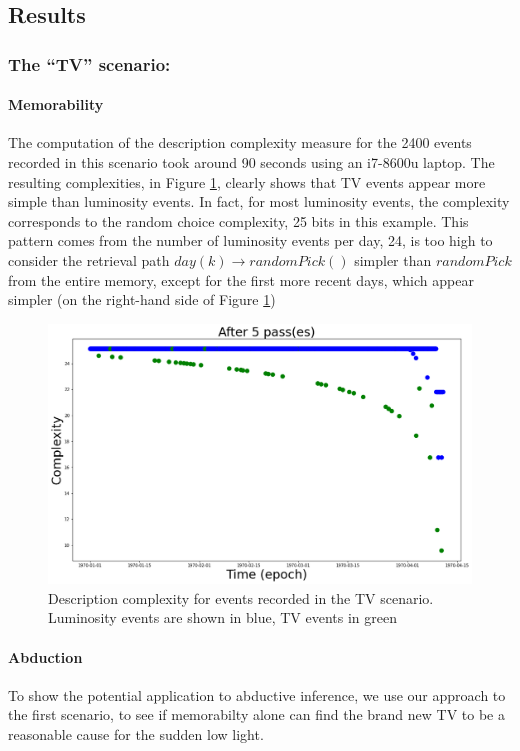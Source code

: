 \documentclass[entropy,article,submit,moreauthors,pdftex]{Definitions/mdpi}
\begin{document}
\subsection{Results}
\label{sec:example}

\subsubsection{The ``TV'' scenario:}
\paragraph{Memorability}
The computation of the description complexity measure for the 2400 events recorded in this scenario took around 90 seconds using an i7-8600u laptop. The resulting complexities, in Figure \ref{fig:scenar1_complexity}, clearly shows that TV events appear more simple than luminosity events. In fact, for most luminosity events, the complexity corresponds to the random choice complexity, 25 bits in this example. This pattern comes from the number of luminosity events per day, 24, is too high to consider the retrieval path $day(k) \rightarrow randomPick()$ simpler than $randomPick$ from the entire memory, except for the first more recent days, which appear simpler (on the right-hand side of Figure \ref{fig:scenar1_complexity})
\begin{figure}
    \centering
    \includegraphics[width=.7\linewidth]{figures/memorability_scenar_1.png}
    \caption{Description complexity for events recorded in the TV scenario. Luminosity events are shown in blue, TV events in green}
    \label{fig:scenar1_complexity}
\end{figure}
\paragraph{Abduction}
To show the potential application to abductive inference, we use our approach to the first scenario, to see if memorabilty alone can find the brand new TV to be a reasonable cause for the sudden low light.
\end{document}
